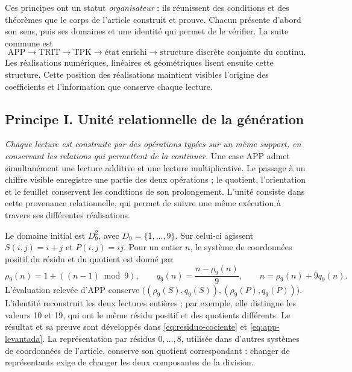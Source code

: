 Ces principes ont un statut \emph{organisateur} : ils réunissent des conditions et des
théorèmes que le corps de l’article construit et prouve. Chacun présente d’abord
son sens, puis ses domaines et une identité qui permet de le vérifier.
La suite commune est
\[
 \mathrm{APP}\longrightarrow\mathrm{TRIT}\longrightarrow\mathrm{TPK}
 \longrightarrow\text{état enrichi}
 \longrightarrow\text{structure discrète conjointe du continu}.
\]
Les réalisations numériques, linéaires et géométriques lisent ensuite cette structure. Cette position des réalisations maintient visibles l'origine des coefficients et l'information que conserve chaque lecture.

\subsection*{Principe I. Unité relationnelle de la génération}
\hypertarget{prinh:unidad}{}

\emph{Chaque lecture est construite par des opérations typées sur un
même support, en conservant les relations qui permettent de la continuer.} Une
case APP admet simultanément une lecture additive et une lecture multiplicative.
Le passage à un chiffre visible enregistre une partie des deux opérations ; le
quotient, l’orientation et le feuillet conservent les conditions de son
prolongement. L’unité consiste dans cette provenance relationnelle, qui permet de
suivre une même exécution à travers ses différentes réalisations.

Le domaine initial est \(D_9^2\), avec \(D_9=\{1,\ldots,9\}\). Sur celui-ci
agissent \(S(i,j)=i+j\) et \(P(i,j)=ij\). Pour un entier \(n\), le système de coordonnées
positif du résidu et du quotient est donné par
\[
 \rho_9(n)=1+((n-1)\bmod9),\qquad
 q_9(n)=\frac{n-\rho_9(n)}9,\qquad
 n=\rho_9(n)+9q_9(n).
\]
L’évaluation relevée d’APP conserve
\(\bigl((\rho_9(S),q_9(S)),(\rho_9(P),q_9(P))\bigr)\).
L’identité reconstruit les deux lectures entières ; par exemple, elle distingue
les valeurs 10 et 19, qui ont le même résidu positif et des quotients
différents. Le résultat et sa preuve sont développés dans
\eqref{eq:residuo-cociente} et \eqref{eq:app-levantada}. La représentation
par résidus \(0,\ldots,8\), utilisée dans d’autres systèmes de coordonnées de l’article, conserve
son quotient correspondant : changer de représentants exige de changer les deux
composantes de la division.


